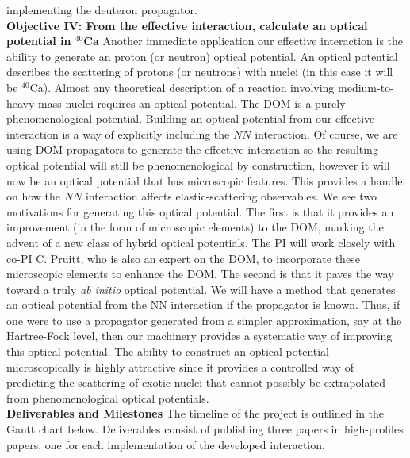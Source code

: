 \documentclass[12pt]{article}
\begin{document}
implementing the deuteron propagator.
\\
\textbf{Objective IV: From the effective interaction, calculate an optical potential in $^{40}$Ca}
Another immediate application our effective interaction is the ability to generate an proton (or neutron) optical potential. An optical potential describes the scattering of
protons (or neutrons) with nuclei (in this case it will be $^{40}$Ca). Almost any theoretical description of a reaction involving medium-to-heavy mass nuclei requires an optical
potential. The DOM is a purely phenomenological potential. Building an optical potential from our effective interaction is a way of explicitly including the $NN$ interaction. Of
course, we are using DOM propagators to generate the effective interaction so the resulting optical potential will still be phenomenological by construction, however it will now be
an optical potential that has microscopic features. This provides a handle on how the $NN$ interaction affects elastic-scattering observables. We see two motivations for generating
this optical potential. The first is that it provides an improvement (in the form of microscopic elements) to the DOM, marking  the advent of a new class of hybrid optical
potentials. The PI will work closely with co-PI C. Pruitt, who is also an expert on the DOM, to incorporate these microscopic elements to enhance the DOM. The second is that it paves the way toward a truly \textit{ab initio} optical potential. We will have a method that generates an optical potential from the NN
interaction if the propagator is known. Thus, if one were to use a propagator generated from a simpler approximation, say at the Hartree-Fock level, then our machinery provides a
systematic way of improving this optical potential. The ability to construct an optical potential microscopically is highly attractive since it provides a controlled way of
predicting the scattering of exotic nuclei that cannot possibly be extrapolated from phenomenological optical potentials. 
\\
\textbf{Deliverables and Milestones}
The timeline of the project is outlined in the Gantt chart below. Deliverables consist of publishing three papers in high-profiles papers, one for each implementation of the
developed interaction.
\end{document}
